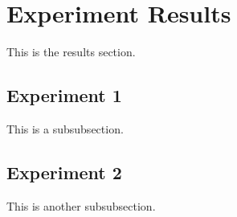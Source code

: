 \clearpage
\section{Experiment Results}
This is the results section.

\subsection{Experiment 1}
This is a subsubsection.

\subsection{Experiment 2}
This is another subsubsection.

